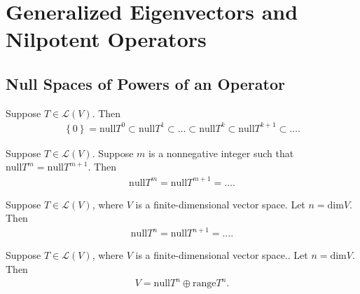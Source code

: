 \documentclass{memoir}
\begin{document}
\chapter{Generalized Eigenvectors and Nilpotent Operators}
\label{cha:generalized_eigenvectors_and_nilpotent_operators}
\section{Null Spaces of Powers of an Operator}
\label{sec:null_spaces_of_powers_of_an_operator}
\begin{prop}
	Suppose \(T \in \mathcal{L}(V)\). Then
	\begin{align*}
		\left\{ 0 \right\} = \textrm{null} T^{0} \subset \textrm{null}T^{1} \subset \ldots\subset \textrm{null}T^{k} \subset \textrm{null}T^{k+1}\subset \ldots .
	\end{align*}
\end{prop}

\begin{prop}
	Suppose \(T \in \mathcal{L}(V)\). Suppose \(m\) is a nonnegative integer such that \( \textrm{null}T^{m} = \textrm{null}T^{m+1}\). Then
	\begin{align*}
		\textrm{null}T^{m} = \textrm{null}T^{m+1} = \ldots .
	\end{align*}
\end{prop}
\begin{prop}
	Suppose \(T \in \mathcal{L}(V)\), where \(V\) is a finite-dimensional vector space. Let \(n = \textrm{dim}V\). Then
	\begin{align*}
		\textrm{null}T^{n} = \textrm{null}T^{n+1} = \ldots .
	\end{align*}
\end{prop}
\begin{prop}
	Suppose \(T \in \mathcal{L}(V)\), where \(V\) is a finite-dimensional vector space.. Let \(n = \textrm{dim}V\). Then
	\begin{align*}
		V = \textrm{null}T^{n} \oplus \textrm{range} T^{n}.
	\end{align*}
\end{prop}
\end{document}
